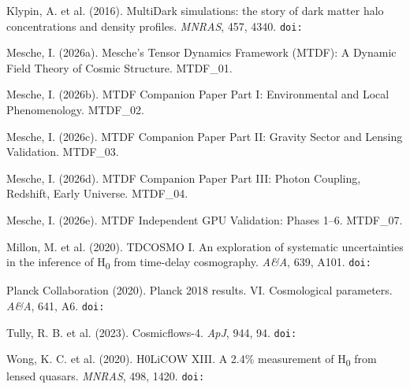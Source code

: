 \documentclass[11pt,a4paper]{article}
\begin{document}
Klypin, A. et al. (2016). MultiDark simulations: the story of dark matter halo concentrations and density profiles. \emph{MNRAS}, 457, 4340. \texttt{doi:{\small\protect{}}}

Mesche, I. (2026a). Mesche's Tensor Dynamics Framework (MTDF): A Dynamic Field Theory of Cosmic Structure. MTDF\_\allowbreak{}01.

Mesche, I. (2026b). MTDF Companion Paper Part I: Environmental and Local Phenomenology. MTDF\_\allowbreak{}02.

Mesche, I. (2026c). MTDF Companion Paper Part II: Gravity Sector and Lensing Validation. MTDF\_\allowbreak{}03.

Mesche, I. (2026d). MTDF Companion Paper Part III: Photon Coupling, Redshift, Early Universe. MTDF\_\allowbreak{}04.

Mesche, I. (2026e). MTDF Independent GPU Validation: Phases 1--6. MTDF\_\allowbreak{}07.

Millon, M. et al. (2020). TDCOSMO I. An exploration of systematic uncertainties in the inference of H\textsubscript{0} from time-delay cosmography. \emph{A\&A}, 639, A101. \texttt{doi:{\small\protect{}}}

Planck Collaboration (2020). Planck 2018 results. VI. Cosmological parameters. \emph{A\&A}, 641, A6. \texttt{doi:{\small\protect{}}}

Tully, R. B. et al. (2023). Cosmicflows-4. \emph{ApJ}, 944, 94. \texttt{doi:{\small\protect{}}}

Wong, K. C. et al. (2020). H0LiCOW XIII. A 2.4\% measurement of H\textsubscript{0} from lensed quasars. \emph{MNRAS}, 498, 1420. \texttt{doi:{\small\protect{}}}
\end{document}
